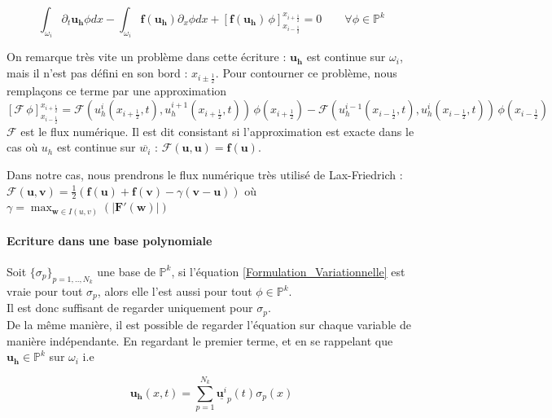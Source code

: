 \begin{equation}\label{Formulation_Variationnelle}
    \int_{\omega_i} \partial_t \mathbf{u_h} \phi dx - \int_{\omega_i} \mathbf{f}(\mathbf{u_h}) \partial_x \phi dx + \left[ \mathbf{f}(\mathbf{u_h})\,\phi \right]_{x_{i-\frac{1}{2}}}^{x_{i+\frac{1}{2}}} = 0 \qquad \forall \phi \in \mathbb{P}^k
\end{equation}

On remarque très vite un problème dans cette écriture : $\mathbf{u_h}$ est continue sur $\omega_i$, mais il n'est pas défini en son bord : $ {x_{i\pm\frac{1}{2}}}$. 
Pour contourner ce problème, nous remplaçons ce terme par une approximation 
$$ \left[ \mathcal{F}\, \phi \right]_{x_{i-\frac{1}{2}}}^{x_{i+\frac{1}{2}}}
=  \mathcal{F}(u_h^i(x_{i+\frac{1}{2}},t), u_h^{i+1}(x_{i+\frac{1}{2}},t)) \, \phi(x_{i+\frac{1}{2}}) - \mathcal{F}(u_h^{i-1}(x_{i-\frac{1}{2}},t), u_h^i(x_{i-\frac{1}{2}},t)) \, \phi(x_{i-\frac{1}{2}})    $$ 
$\mathcal{F}$ est le flux numérique. Il est dit consistant si l'approximation est exacte dans le cas où $u_h$ est continue sur $\overline{w_i}$ : $\mathcal{F}(\mathbf{u},\mathbf{u}) =  \mathbf{f}(\mathbf{u})$.

\noindent
Dans notre cas, nous prendrons le flux numérique très utilisé de Lax-Friedrich : $ \mathcal{F}(\mathbf{u},\mathbf{v}) = \frac{1}{2}(\mathbf{f}(\mathbf{u}) + \mathbf{f}(\mathbf{v}) - \gamma(\mathbf{v}-\mathbf{u}) )  $
où $\gamma = \max_{\mathbf{w} \in I(u,v)} (|\mathbf{F'(\mathbf{w})}| )$

\paragraph{Ecriture dans une base polynomiale \\}

Soit $\{\sigma_p\}_{p=1,..,N_k}$ une base de $\mathbb{P}^k$, si l'équation \eqref{Formulation_Variationnelle} est vraie pour tout $\sigma_p$, alors elle l'est aussi pour tout $\phi \in \mathbb{P}^k$.\\
Il est donc suffisant de regarder uniquement pour $\sigma_p$.\\ 
De la même manière, il est possible de regarder l'équation sur chaque variable de manière indépendante.
En regardant le premier terme, et en se rappelant que $\mathbf{u_h} \in \mathbb{P}^k$ sur $\omega_i$ i.e 

\begin{equation}
    \mathbf{u_h}(x,t) = \sum_{p=1}^{N_k} \underline{\mathbf{u}^i}_p(t) \sigma_p(x) 
\end{equation}

